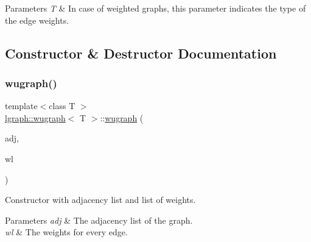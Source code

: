 \begin{DoxyParams}{Parameters}
{\em T} & In case of weighted graphs, this parameter indicates the type of the edge weights. \\
\hline
\end{DoxyParams}


\subsection{Constructor \& Destructor Documentation}
\mbox{\label{classlgraph_1_1wugraph_a489f406928d9e982c7fa5b0a3cea53f5}} 
\subsubsection{\texorpdfstring{wugraph()}{wugraph()}\hspace{0.1cm}{\footnotesize\ttfamily [1/2]}}
{\footnotesize\ttfamily template$<$class T $>$ \\
\hyperlink{classlgraph_1_1wugraph}{lgraph\+::wugraph}$<$ T $>$\+::\hyperlink{classlgraph_1_1wugraph}{wugraph} (\begin{DoxyParamCaption}\item[{const std\+::vector$<$ \hyperlink{namespacelgraph_a052e7766c13f3a43cec0aec8173fdede}{neighbourhood} $>$ \&}]{adj,  }\item[{const std\+::vector$<$ \hyperlink{namespacelgraph_a1e0fd5ef0a78b2a92da48adbed265cb6}{weight\+\_\+list}$<$ T $>$ $>$ \&}]{wl }\end{DoxyParamCaption})}



Constructor with adjacency list and list of weights. 


\begin{DoxyParams}{Parameters}
{\em adj} & The adjacency list of the graph. \\
\hline
{\em wl} & The weights for every edge. \\
\hline
\end{DoxyParams}
\mbox{\label{classlgraph_1_1wugraph_a958ee0cc05df616aacb077e2effffcf9}} 
